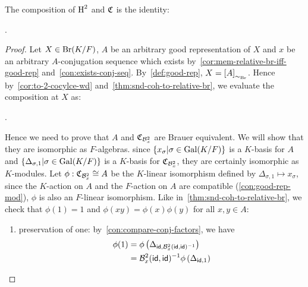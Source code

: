 \begin{lemma}\label{lem:relative-br-snd-inverse-2}
  The composition of $\operatorname{H}^{2}$ and $\operatorname{\mathfrak{C}}$ is the identity:
  \begin{center}
    .
  \end{center}
  \leanok
\end{lemma}
\begin{proof}
  Let $X \in \operatorname{Br}(K/F)$, $A$ be an arbitrary good representation of $X$ and $x$ be an arbitrary $A$-conjugation sequence which exists by~\cref{cor:mem-relative-br-iff-good-rep} and~\cref{con:exists-conj-seq}. By~\cref{def:good-rep}, $X = \left[A\right]_{\sim_{\operatorname{Br}}}$.
  Hence by~\cref{cor:to-2-cocylce-wd} and~\cref{thm:snd-coh-to-relative-br}, we evaluate the composition at $X$ as:
  \begin{center}
    .
  \end{center}
  Hence we need to prove that $A$ and $\operatorname{\mathfrak{C}}_{\mathcal{B}^{2}_{x}}$ are Brauer equivalent. We will show that they are isomorphic as $F$-algebras. since $\{x_{\sigma}|\sigma\in\operatorname{Gal}(K/F)\}$ is a $K$-basis for $A$ and $\{\Delta_{\sigma, 1}|\sigma \in \operatorname{Gal}(K/F)\}$ is a $K$-basis for $\operatorname{\mathfrak{C}}_{\mathcal{B}^{2}_{x}}$, they are certainly isomorphic as $K$-modules. Let $\phi : \operatorname{\mathfrak{C}}_{\mathcal{B}^{2}_{x}} \cong A$ be the $K$-linear isomorphism defined by $\Delta_{\sigma, 1} \mapsto x_{\sigma}$, since the $K$-action on $A$ and the $F$-action on $A$ are compatible (\cref{con:good-rep-mod}), $\phi$ is also an $F$-linear isomorphism. Like in~\cref{thm:snd-coh-to-relative-br}, we check that $\phi(1) = 1$ and $\phi(xy)=\phi(x)\phi(y)$ for all $x,y \in A$:
  \begin{enumerate}
    \item preservation of one: by~\cref{con:compare-conj-factors}, we have
          \[
          \begin{aligned}
            \phi(1)
            &= \phi\left(\Delta_{\id,\mathcal{B}^{2}_{x}(\id,\id)^{-1}}\right) \\
            &= \mathcal{B}^{2}_{x}(\id,\id)^{-1} \phi\left(\Delta_{\id, 1}\right) \\

\end{aligned}\]
\end{enumerate}
\end{proof}
